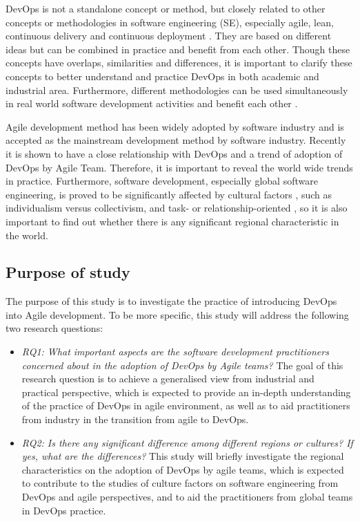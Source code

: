\documentclass[
  12pt,
  a4paper,
]{article}
\providecommand{\tightlist}{%
  \setlength{\itemsep}{0pt}\setlength{\parskip}{0pt}}
\begin{document}
DevOps is not a standalone concept or method, but closely related to
other concepts or methodologies in software engineering (SE), especially
agile, lean, continuous delivery and continuous deployment
\citep{lwakatare2016:relationship}. They are based on different ideas
but can be combined in practice and benefit from each other. Though
these concepts have overlaps, similarities and differences, it is
important to clarify these concepts to better understand and practice
DevOps in both academic and industrial area. Furthermore, different
methodologies can be used simultaneously in real world software
development activities and benefit each other
\citep{Jabbari:2016:what-is-devops}.

Agile development method\citep{beck:2001:agile-Manifesto} has been
widely adopted by software industry and is accepted as the mainstream
development method by software industry. Recently it is shown to have a
close relationship with DevOps and a trend of adoption of DevOps by
Agile Team\citep{lwakatare2016:relationship}. Therefore, it is important
to reveal the world wide trends in practice. Furthermore, software
development, especially global software engineering, is proved to be
significantly affected by cultural factors \citep{Deshpande:2010}, such
as individualism versus collectivism, and task- or relationship-oriented
\citep{olsen:2003}, so it is also important to find out whether there is
any significant regional characteristic in the world.

\hypertarget{sec:rq}{%
\subsection{Purpose of study}\label{sec:rq}}

The purpose of this study is to investigate the practice of introducing
DevOps into Agile development. To be more specific, this study will
address the following two research questions:

\begin{itemize}
\tightlist
\item
  \emph{RQ1: What important aspects are the software development
  practitioners concerned about in the adoption of DevOps by Agile
  teams?} The goal of this research question is to achieve a generalised
  view from industrial and practical perspective, which is expected to
  provide an in-depth understanding of the practice of DevOps in agile
  environment, as well as to aid practitioners from industry in the
  transition from agile to DevOps.
\item
  \emph{RQ2: Is there any significant difference among different regions
  or cultures? If yes, what are the differences?} This study will
  briefly investigate the regional characteristics on the adoption of
  DevOps by agile teams, which is expected to contribute to the studies
  of culture factors on software engineering from DevOps and agile
  perspectives, and to aid the practitioners from global teams in DevOps
  practice.
\end{itemize}
\end{document}
